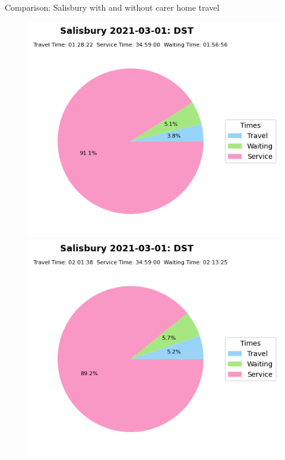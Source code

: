 \documentclass[usenames,dvipsnames]{beamer}
\begin{document}
\begin{frame}{Comparison: Salisbury with and without carer home travel}
	\begin{figure}
		\includegraphics[width=0.5\linewidth]{figures/og_inst_Salisbury_2021-03-01_time_info_dst}%
		\includegraphics[width=0.5\linewidth]{figures/nurse_inst_Salisbury_2021-03-01_time_info_dst}
	\end{figure}
\end{frame}
\end{document}
